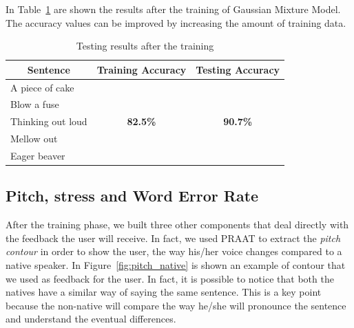 \noindent In Table~\ref{table:accuracy} are shown the results after the training of Gaussian Mixture Model. The accuracy values can be improved by increasing the amount of training data.

\begin{table}[!ht]
	\centering
	\caption{Testing results after the training}
	\label{table:accuracy}
	\begin{tabular}{|l|c|c|}
		\hline
		\multicolumn{1}{|c|}{\textbf{Sentence}} & \textbf{Training Accuracy}       & \textbf{Testing Accuracy}        \\ \hline
		A piece of cake                         & 								   &
		\\ \cline{1-1}
		Blow a fuse                             &                                  &                                  \\ \cline{1-1}
		Thinking out loud                       &  \textbf{82.5\%}                 & \textbf{90.7\%}
		\\ \cline{1-1}
		Mellow out                              &                                  &                                  \\ \cline{1-1}
		Eager beaver                            &                                  &                                  \\ \hline
	\end{tabular}
\end{table}

\subsection{Pitch, stress and Word Error Rate}
\noindent After the training phase, we built three other components that deal directly with the feedback the user will receive. In fact, we used PRAAT to extract the \textit{pitch contour} in order to show the user, the way his/her voice changes compared to a native speaker. In Figure~\ref{fig:pitch_native} is shown an example of contour that we used as feedback for the user. In fact, it is possible to notice that both the natives have a similar way of saying the same sentence. This is a key point because the non-native will compare the way he/she will pronounce the sentence and understand the eventual differences. \\

